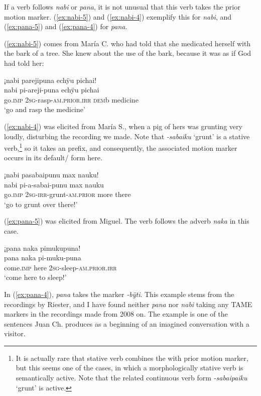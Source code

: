 If a verb follows \textit{nabi} or \textit{pana}, it is not unusual that this verb takes the prior motion marker. (\ref{ex:nabi-5}) and (\ref{ex:nabi-4}) exemplify this for \textit{nabi}, and (\ref{ex:pana-5}) and (\ref{ex:pana-4}) for \textit{pana}.

(\ref{ex:nabi-5}) comes from María C. who had told that she medicated herself with the bark of a tree. She knew about the use of the bark, because it was as if God had told her:

\ea\label{ex:nabi-5}
\begingl
\glpreamble ¡nabi parejipuna echÿu pichai!\\
\gla nabi pi-areji-puna echÿu pichai \\
\glb go.\textsc{imp} 2\textsc{sg}-rasp-\textsc{am.prior.irr} \textsc{dem}b medicine\\
\glft ‘go and rasp the medicine’
\endgl
\trailingcitation{[ump-p110815sf.371]}
\xe

(\ref{ex:nabi-4}) was elicited from María S., when a pig of hers was grunting very loudly, disturbing the recording we made. Note that \textit{-sabaiku} ‘grunt’ is a stative verb,\footnote{It is actually rare that stative verb combines the with prior motion marker, but this seems one of the cases, in which a morphologically stative verb is semantically active. Note that the related continuous verb form \textit{-sabaipaiku} ‘grunt’ is active.} so it takes an  prefix, and consequently, the associated motion marker occurs in its default/ form here.

\ea\label{ex:nabi-4}
\begingl
\glpreamble ¡nabi pasabaipunu max nauku!\\
\gla nabi pi-a-sabai-punu max nauku\\
\glb go.\textsc{imp} 2\textsc{sg}-\textsc{irr}-grunt-\textsc{am.prior} more there\\
\glft ‘go to grunt over there!’
\endgl
\trailingcitation{[rmx-e150922l.159]}
\xe

(\ref{ex:pana-5}) was elicited from Miguel. The verb follows the adverb \textit{naka} in this case.

\ea\label{ex:pana-5}
\begingl
\glpreamble ¡pana naka pimukupuna!\\
\gla pana naka pi-muku-puna\\
\glb come.\textsc{imp} here 2\textsc{sg}-sleep-\textsc{am.prior.irr}\\
\glft ‘come here to sleep!’
\endgl
\trailingcitation{[mxx-e160811sd.232]}
\xe

In (\ref{ex:pana-4}), \textit{pana} takes the  marker \textit{-bÿti}. This example stems from the recordings by Riester, and I have found neither \textit{pana} nor \textit{nabi} taking any TAME markers in the recordings made from 2008 on. The example is one of the sentences Juan Ch. produces as a beginning of an imagined conversation with a visitor.

